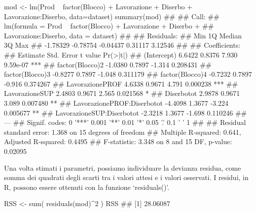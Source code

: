 \documentclass[a4paper,12pt,oneside]{book}
\newenvironment{Shaded}{}{}
\newcommand{\KeywordTok}[1]{#1}
\newcommand{\DataTypeTok}[1]{#1}
\newcommand{\DecValTok}[1]{#1}
\newcommand{\StringTok}[1]{#1}
\newcommand{\CommentTok}[1]{#1}
\newcommand{\OperatorTok}[1]{#1}
\newcommand{\NormalTok}[1]{#1}
\begin{document}
\begin{Shaded}
\begin{Highlighting}[]
\NormalTok{mod <-}\StringTok{ }\KeywordTok{lm}\NormalTok{(Prod }\OperatorTok{~}\StringTok{ }\KeywordTok{factor}\NormalTok{(Blocco) }\OperatorTok{+}\StringTok{ }\NormalTok{Lavorazione }\OperatorTok{+}\StringTok{ }\NormalTok{Diserbo }\OperatorTok{+}
\StringTok{            }\NormalTok{Lavorazione}\OperatorTok{:}\NormalTok{Diserbo, }\DataTypeTok{data=}\NormalTok{dataset)}
\KeywordTok{summary}\NormalTok{(mod)}
\CommentTok{## }
\CommentTok{## Call:}
\CommentTok{## lm(formula = Prod ~ factor(Blocco) + Lavorazione + Diserbo + }
\CommentTok{##     Lavorazione:Diserbo, data = dataset)}
\CommentTok{## }
\CommentTok{## Residuals:}
\CommentTok{##      Min       1Q   Median       3Q      Max }
\CommentTok{## -1.78329 -0.78754 -0.04437  0.31117  3.12546 }
\CommentTok{## }
\CommentTok{## Coefficients:}
\CommentTok{##                            Estimate Std. Error t value Pr(>|t|)    }
\CommentTok{## (Intercept)                  6.6422     0.8376   7.930 9.59e-07 ***}
\CommentTok{## factor(Blocco)2             -1.0380     0.7897  -1.314 0.208431    }
\CommentTok{## factor(Blocco)3             -0.8277     0.7897  -1.048 0.311179    }
\CommentTok{## factor(Blocco)4             -0.7232     0.7897  -0.916 0.374267    }
\CommentTok{## LavorazionePROF              4.6338     0.9671   4.791 0.000238 ***}
\CommentTok{## LavorazioneSUP               2.4803     0.9671   2.565 0.021568 *  }
\CommentTok{## Diserbotot                   2.9878     0.9671   3.089 0.007480 ** }
\CommentTok{## LavorazionePROF:Diserbotot  -4.4098     1.3677  -3.224 0.005677 ** }
\CommentTok{## LavorazioneSUP:Diserbotot   -2.3218     1.3677  -1.698 0.110246    }
\CommentTok{## ---}
\CommentTok{## Signif. codes:  0 '***' 0.001 '**' 0.01 '*' 0.05 '.' 0.1 ' ' 1}
\CommentTok{## }
\CommentTok{## Residual standard error: 1.368 on 15 degrees of freedom}
\CommentTok{## Multiple R-squared:  0.641,  Adjusted R-squared:  0.4495 }
\CommentTok{## F-statistic: 3.348 on 8 and 15 DF,  p-value: 0.02095}
\end{Highlighting}
\end{Shaded}

\normalsize

Una volta stimati i parametri, possiamo individuare la devianza residua, come somma dei quadrati degli scarti tra i valori attesi e i valori osservati. I residui, in R, possono essere ottenuti con la funzione `residuals()'.

\begin{Shaded}
\begin{Highlighting}[]
\NormalTok{RSS <-}\StringTok{ }\KeywordTok{sum}\NormalTok{( }\KeywordTok{residuals}\NormalTok{(mod)}\OperatorTok{^}\DecValTok{2}\NormalTok{ )}
\NormalTok{RSS}
\CommentTok{## [1] 28.06087}
\end{Highlighting}
\end{Shaded}
\end{document}
